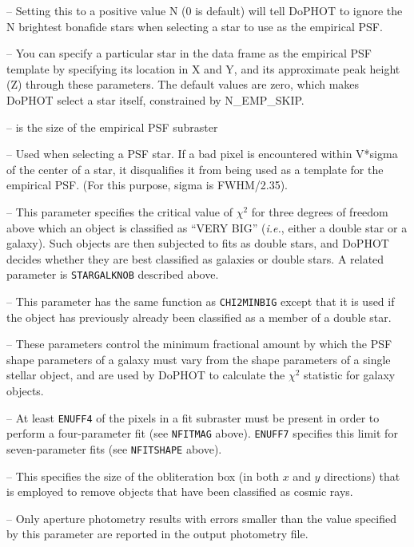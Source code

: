  -- Setting this to a positive value N 
(0 is default) will tell DoPHOT to ignore the N brightest bonafide 
stars when selecting a star to use as the empirical PSF.

 -- You can specify 
a particular star in the data frame as the empirical PSF template
by specifying its location in X and Y, and its approximate peak height
(Z) through these parameters. The default values are zero, which 
makes DoPHOT select a star itself, constrained by N\_EMP\_SKIP.

 -- is the size of the empirical PSF subraster

 -- Used when selecting a PSF star. If a
bad pixel is encountered within V*sigma of the center of a star, it 
disqualifies it from being used as a template for the empirical PSF.
(For this purpose, sigma is FWHM/2.35).

 -- This parameter specifies the critical
value of $\chi^2$ for three degrees of freedom
above which an object is classified as
``VERY BIG'' ({\it i.e.}, either a double star or a galaxy).  
Such objects are then subjected to fits as
double stars, and DoPHOT decides whether they are best classified
as galaxies or double stars. A related parameter is {\tt STARGALKNOB}
described above.

 -- This parameter has the same function as
{\tt CHI2MINBIG} except that it is used if the object has
previously already been classified as a member of a double star.

 -- These parameters control
the minimum fractional amount by which the PSF shape parameters
of a galaxy must vary from the shape parameters of a single
stellar object, and are used by DoPHOT to calculate the 
$\chi^2$ statistic for galaxy objects.

 -- At least {\tt ENUFF4} of the 
pixels in a fit subraster must be present in order to 
perform a four-parameter fit (see {\tt NFITMAG} above).
{\tt ENUFF7} specifies this limit for seven-parameter
fits (see {\tt NFITSHAPE} above).

 -- This specifies the size of the
obliteration box (in both $x$ and $y$ directions) that is
employed to remove objects that have been classified as
cosmic rays.

 -- Only aperture photometry 
results with errors smaller than the value specified
by this parameter are reported in the output photometry
file.


